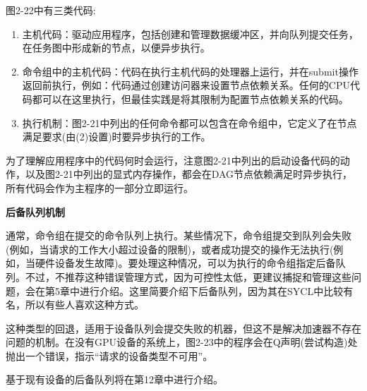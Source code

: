 图2-22中有三类代码:\par

\begin{enumerate}
	\item 主机代码：驱动应用程序，包括创建和管理数据缓冲区，并向队列提交任务，在任务图中形成新的节点，以便异步执行。
	\item 命令组中的主机代码：代码在执行主机代码的处理器上运行，并在submit操作返回前执行，例如：代码通过创建访问器来设置节点依赖关系。任何的CPU代码都可以在这里执行，但最佳实践是将其限制为配置节点依赖关系的代码。
	\item 执行机制：图2-21中列出的任何命令都可以包含在命令组中，它定义了在节点满足要求(由(2)设置)时要异步执行的工作。
\end{enumerate}

为了理解应用程序中的代码何时会运行，注意图2-21中列出的启动设备代码的动作，以及图2-21中列出的显式内存操作，都会在DAG节点依赖满足时异步执行，所有代码会作为主程序的一部分立即运行。\par

\hspace*{\fill} \par %
\textbf{后备队列机制}

通常，命令组在提交的命令队列上执行。某些情况下，命令组提交到队列会失败(例如，当请求的工作大小超过设备的限制)，或者成功提交的操作无法执行(例如，当硬件设备发生故障)。要处理这种情况，可以为执行的命令组指定后备队列。不过，不推荐这种错误管理方式，因为可控性太低，更建议捕捉和管理这些问题，会在第5章中进行介绍。这里简要介绍下后备队列，因为其在SYCL中比较有名，所以有些人喜欢这种方式。\par

这种类型的回退，适用于设备队列会提交失败的机器，但这不是解决加速器不存在问题的机制。在没有GPU设备的系统上，图2-23中的程序会在Q声明(尝试构造)处抛出一个错误，指示“请求的设备类型不可用”。\par

基于现有设备的后备队列将在第12章中进行介绍。\par

